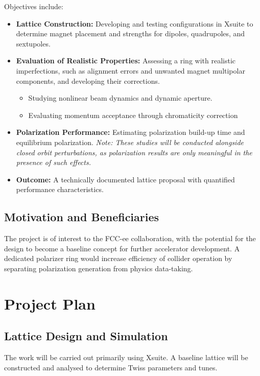\documentclass[aip,twocolumn,10pt,graphicx]{revtex4-1}
\begin{document}
Objectives include:
\begin{itemize}
\item \textbf{Lattice Construction:} Developing and testing configurations in Xsuite to determine magnet placement and strengths for dipoles, quadrupoles, and sextupoles.
\item \textbf{Evaluation of Realistic Properties:} Assessing a ring with realistic imperfections, such as alignment errors and unwanted magnet multipolar components, and developing their corrections.
    \begin{itemize}
    \item Studying nonlinear beam dynamics and dynamic aperture.
    \item Evaluating momentum acceptance through chromaticity correction
\end{itemize}

\item \textbf{Polarization Performance:} Estimating polarization build-up time and equilibrium polarization. \textit{Note: These studies will be conducted alongside closed orbit perturbations, as polarization results are only meaningful in the presence of such effects.}
\item \textbf{Outcome:} A technically documented lattice proposal with quantified performance characteristics.
\end{itemize}


\subsection{Motivation and Beneficiaries}
The project is of interest to the FCC-ee collaboration, with the potential for the design to become a baseline concept for further accelerator development. A dedicated polarizer ring would increase efficiency of collider operation by separating polarization generation from physics data-taking.

\section{Project Plan}

\subsection{Lattice Design and Simulation}

The work will be carried out primarily using Xsuite. A baseline lattice will be constructed and analysed to determine Twiss parameters and tunes.
\end{document}

